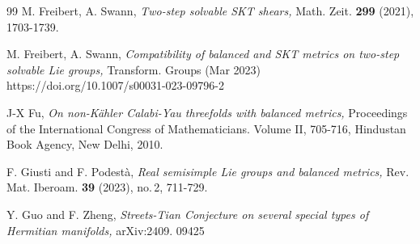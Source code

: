 \documentclass{amsart}
\begin{document}
\begin{thebibliography}{99}
  M. Freibert, A. Swann, \emph{Two-step solvable SKT shears,}  Math. Zeit. {\bf 299} (2021), 1703-1739.



  M. Freibert, A. Swann, \emph{Compatibility of balanced and SKT metrics on two-step solvable Lie groups,} Transform. Groups (Mar 2023)  https://doi.org/10.1007/s00031-023-09796-2


 J-X Fu,  {\em On non-K\"ahler Calabi-Yau threefolds with balanced metrics,} Proceedings of the International Congress of Mathematicians. Volume II, 705-716, Hindustan Book Agency, New Delhi, 2010.









 F. Giusti and F. Podest\`a, \emph{Real semisimple Lie groups and balanced metrics,} Rev. Mat. Iberoam. {\bf 39} (2023), no.\,2, 711-729.






 Y. Guo and F. Zheng, \emph{Streets-Tian Conjecture on several special types of Hermitian manifolds,} arXiv:2409. 09425





\end{thebibliography}
\end{document}
